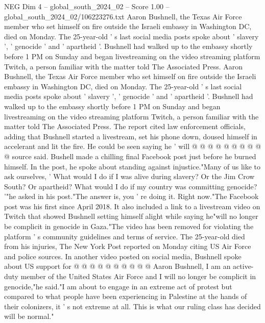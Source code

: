 \begin{textsample}{NEG Dim 4 – global\_south\_2024\_02 – Score 1.00 – global\_south\_2024\_02/106223276.txt}  \label{ex:f4_neg_388}
Aaron Bushnell, the Texas Air Force member who set himself on fire outside the Israeli embassy in Washington DC, died on Monday.
The 25-year-old ' s last social media posts spoke about ' slavery ', ' genocide ' and ' apartheid '.
Bushnell had walked up to the embassy shortly before 1 PM on Sunday and began livestreaming on the video streaming platform Twitch, a person familiar with the matter told The Associated Press.
Aaron Bushnell, the Texas Air Force member who set himself on fire outside the Israeli embassy in Washington DC, died on Monday.
The 25-year-old ' s last social media posts spoke about ' slavery ', ' genocide ' and ' apartheid '.
Bushnell had walked up to the embassy shortly before 1 PM on Sunday and began livestreaming on the video streaming platform Twitch, a person familiar with the matter told The Associated Press.
The report cited law enforcement officials, adding that Bushnell started a livestream, set his phone down, doused himself in accelerant and lit the fire.
He could be seen saying he ' will @ @ @ @ @ @ @ @ @ @ source said.
Bushell made a chilling final Facebook post just before he burned himself.
In the post, he spoke about standing against injustice."Many of us like to ask ourselves, ' What would I do if I was alive during slavery?
Or the Jim Crow South?
Or apartheid?
What would I do if my country was committing genocide? '"he asked in his post."The answer is, you ' re doing it.
Right now."The Facebook post was his first since April 2018.
It also included a link to a livestream video on Twitch that showed Bushnell setting himself alight while saying he"will no longer be complicit in genocide in Gaza."The video has been removed for violating the platform ' s community guidelines and terms of service.
The 25-year-old died from his injuries, The New York Post reported on Monday citing US Air Force and police sources.
In another video posted on social media, Bushnell spoke about US support for @ @ @ @ @ @ @ @ @ @ Aaron Bushnell, I am an active-duty member of the United States Air Force and I will no longer be complicit in genocide,"he said."I am about to engage in an extreme act of protest but compared to what people have been experiencing in Palestine at the hands of their colonizers, it ' s not extreme at all.
This is what our ruling class has decided will be normal."

\end{textsample}
